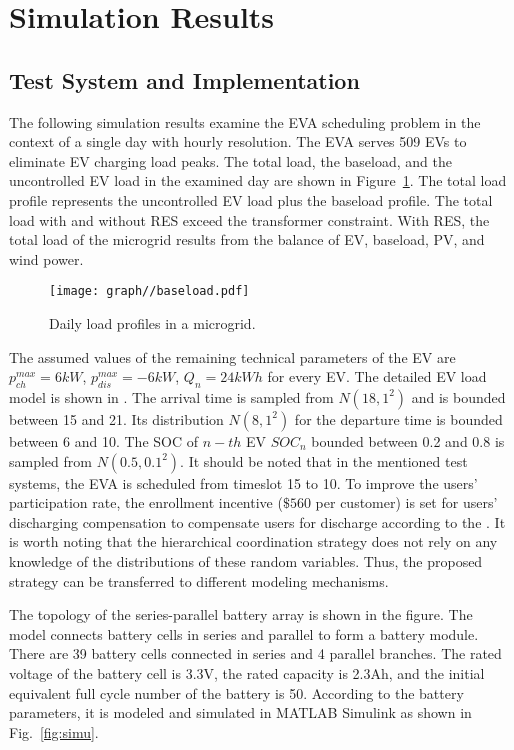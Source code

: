 \documentclass[journal,twoside]{IEEEtran}
\begin{document}
\section{Simulation Results}

\subsection{Test System and Implementation}
The following simulation results examine the EVA scheduling problem in the context of a single day with hourly resolution. The EVA serves 509 EVs to eliminate EV charging load peaks. The total load, the baseload, and the uncontrolled EV load in the examined day are shown in Figure~\ref{fig:baseload}. The total load profile represents the uncontrolled EV load plus the baseload profile. The total load with and without RES exceed the transformer constraint. With RES, the total load of the microgrid results from the balance of EV, baseload, PV, and wind power.

\begin{figure}[h]
\centering
\texttt{[image: graph//baseload.pdf]}
\caption{Daily load profiles in a microgrid.}
\label{fig:baseload}
\end{figure}


The assumed values of the remaining technical parameters of the EV are $p_{ch}^{max}= 6 kW$, $p_{dis}^{max}= -6 kW$, $Q_n=24 kWh$ for every EV. The detailed EV load model is shown in \cite{zhang2021optimal}. The arrival time is sampled from $N(18, 1^2)$ and is bounded between 15 and 21. Its distribution $N(8, 1^2)$ for the departure time is bounded between 6 and 10. The SOC of $n-th$ EV $SOC_n$ bounded between 0.2 and 0.8 is sampled from $N(0.5, 0.1^2)$. It should be noted that in the mentioned test systems, the EVA is scheduled from timeslot 15 to 10. To improve the users' participation rate, the enrollment incentive ($\$560$ per customer) is set for users' discharging compensation to compensate users for discharge according to the \cite{9384297}. It is worth noting that the hierarchical coordination strategy does not rely on any knowledge of the distributions of these random variables. Thus, the proposed strategy can be transferred to different modeling mechanisms.

The topology of the series-parallel battery array is shown in the figure. The model connects battery cells in series and parallel to form a battery module. There are 39 battery cells connected in series and 4 parallel branches. The rated voltage of the battery cell is 3.3V, the rated capacity is 2.3Ah, and the initial equivalent full cycle number of the battery is 50. According to the battery parameters, it is modeled and simulated in MATLAB Simulink as shown in Fig.~\ref{fig:simu}.
\end{document}
